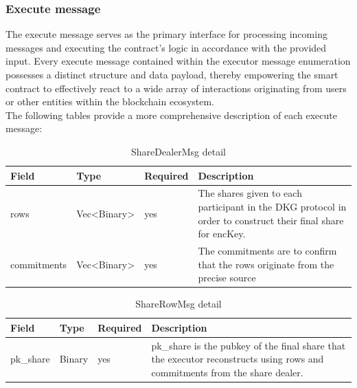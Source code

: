 \documentclass[../Main.tex]{subfiles}
\begin{document}
\subsubsection{Execute message}
The execute message serves as the primary interface for processing incoming messages and executing the contract's logic in accordance with the provided input. Every execute message contained within the executor message enumeration possesses a distinct structure and data payload, thereby empowering the smart contract to effectively react to a wide array of interactions originating from users or other entities within the blockchain ecosystem.\\

The following tables provide a more comprehensive description of each execute message:\\
\begin{table}[H]
  \centering
  \begin{tabular}{|l|l|l|p{8cm}|}
\hline
\rowcolor[HTML]{F56B00} 
\textbf{Field}                      & \textbf{Type}                      & \textbf{Required} & \textbf{Description}                                                                                         \\ \hline
\cellcolor[HTML]{FFFFFF}rows        & Vec\textless{}Binary\textgreater{} & yes               & The shares given to each participant in the DKG protocol in order to construct their final share for encKey. \\ \hline
\cellcolor[HTML]{FFFFFF}commitments & Vec\textless{}Binary\textgreater{} & yes               & The commitments are to confirm that the rows originate from the precise source                               \\ \hline
\end{tabular}
  \caption{ShareDealerMsg detail}
  \label{sharedealer-msg-detail}
\end{table}

\begin{table}[H]
  \centering
  \begin{tabular}{|l|l|l|p{8cm}|}
\hline
\rowcolor[HTML]{F56B00} 
\textbf{Field}                    & \textbf{Type} & \textbf{Required} & \textbf{Description}                                                                                                        \\ \hline
\cellcolor[HTML]{FFFFFF}pk\_share & Binary        & yes               & pk\_share is the pubkey of the final share that the executor reconstructs using rows and commitments from the share dealer. \\ \hline
\end{tabular}
  \caption{ShareRowMsg detail}
  \label{sharerow-msg-detail}
\end{table}
\end{document}

